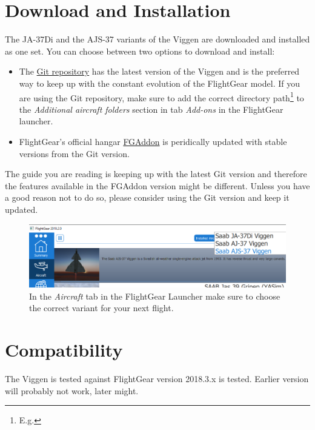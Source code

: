 \section{Download and Installation}
The JA-37Di and the AJS-37 variants of the Viggen are downloaded and installed as one set. You can choose between two options to download and install:
\begin{itemize}
\item The \href{https://github.com/NikolaiVChr/flightgear-saab-ja-37-viggen}{Git repository} has the latest version of the Viggen and is the preferred way to keep up with the constant evolution of the FlightGear model. If you are using the Git repository, make sure to add the correct directory path\footnote{E.g. } to the \emph{Additional aircraft folders} section in tab \emph{Add-ons} in the FlightGear launcher.
\item FlightGear's official hangar \href{http://wiki.flightgear.org/FGAddon}{FGAddon} is peridically updated with stable versions from the Git version. 
\end{itemize}

The guide you are reading is keeping up with the latest Git version and therefore the features available in the FGAddon version might be different. Unless you have a good reason not to do so, please consider using the Git version and keep it updated.

\begin{figure}[h]
\includegraphics[width=15cm]{images/fg_launcher_choose_aircraft_variant.png}
\caption[Choose Viggen variant in Launcher]{In the \emph{Aircraft} tab in the FlightGear Launcher make sure to choose the correct variant for your next flight.}
\end{figure}

\section{Compatibility}
The Viggen is tested against FlightGear version 2018.3.x is tested. Earlier version will probably not work, later might.


